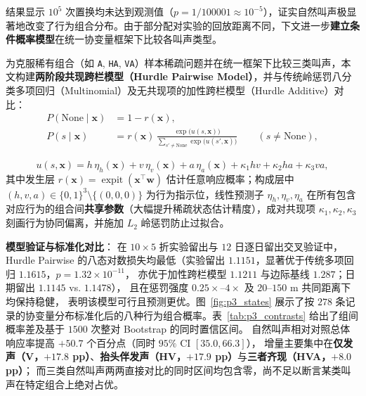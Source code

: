 \documentclass{apmcmthesis}
\begin{document}
结果显示 $10^5$ 次置换均未达到观测值（$p = 1/100001 \approx 10^{-5}$），证实自然叫声极显著地改变了行为组合分布。由于部分配对实验的回放距离不同，下文进一步\textbf{建立条件概率模型}在统一协变量框架下比较各叫声类型。

为克服稀有组合（如 \texttt{A}, \texttt{HA}, \texttt{VA}）样本稀疏问题并在统一框架下比较三类叫声，本文构建\textbf{两阶段共现跨栏模型（Hurdle Pairwise Model）}，并与传统岭惩罚八分类多项回归（Multinomial）及无共现项的加性跨栏模型（Hurdle Additive）对比：
\begin{equation}\label{eq:p3_hurdle}
    \begin{aligned}
        P(\text{None}\mid\mathbf{x}) &= 1-r(\mathbf{x}), \\
        P(s\mid\mathbf{x}) &= r(\mathbf{x})\,
        \frac{\exp\bigl(u(s,\mathbf{x})\bigr)}
             {\sum_{s'\neq\text{None}}\exp\bigl(u(s',\mathbf{x})\bigr)}
        \qquad(s\neq\text{None}),
    \end{aligned}
\end{equation}

\begin{equation}\label{eq:p3_utility}
    u(s, \mathbf{x}) = h\,\eta_h(\mathbf{x}) + v\,\eta_v(\mathbf{x}) + a\,\eta_a(\mathbf{x}) + \kappa_1 hv + \kappa_2 ha + \kappa_3 va,
\end{equation}
其中发生层 $r(\mathbf{x}) = \operatorname{expit}(\mathbf{x}^\top \mathbf{w})$ 估计任意响应概率；构成层中 $(h,v,a) \in \{0,1\}^3 \setminus \{(0,0,0)\}$ 为行为指示位，线性预测子 $\eta_h, \eta_v, \eta_a$ 在所有包含对应行为的组合间\textbf{共享参数}（大幅提升稀疏状态估计精度），成对共现项 $\kappa_1, \kappa_2, \kappa_3$ 刻画行为协同偏离，并施加 $L_2$ 岭惩罚防止过拟合。

\textbf{模型验证与标准化对比}：
在 $10 \times 5$ 折实验留出与 $12$ 日逐日留出交叉验证中，Hurdle Pairwise 的八态对数损失均最低（实验留出 $1.1151$，显著优于传统多项回归 $1.1615$，$p = 1.32 \times 10^{-11}$，
亦优于加性跨栏模型 $1.1211$ 与边际基线 $1.287$；日期留出 $1.1145$ vs. $1.1478$），
且在惩罚强度 $0.25\times$--$4\times$ 及 $20\text{--}150\text{ m}$ 共同距离下均保持稳健，
表明该模型可行且预测更优。图~\ref{fig:p3_states} 展示了按 $278$ 条记录的协变量分布标准化后的八种行为组合概率。表~\ref{tab:p3_contrasts} 给出了组间概率差及基于 $1500$ 次整对 Bootstrap 的同时置信区间。
自然叫声相对对照总体响应率提高 $+50.7$ 个百分点（同时 $95\%$ CI $[35.0, 66.3]$），
增量主要集中在\textbf{仅发声（V，$+17.8$ pp）}、\textbf{抬头伴发声（HV，$+17.9$ pp）}与\textbf{三者齐现（HVA，$+8.0$ pp）}；
而三类自然叫声两两直接对比的同时区间均包含零，尚不足以断言某类叫声在特定组合上绝对占优。
\end{document}
